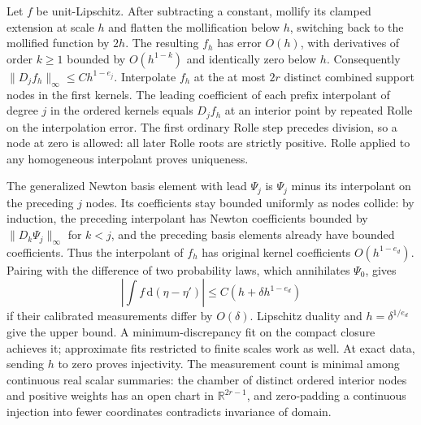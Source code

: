 \documentclass[11pt]{article}
\begin{document}
Let \(f\) be unit-Lipschitz. After subtracting a constant, mollify its clamped extension at scale \(h\) and flatten the mollification below \(h\), switching back to the mollified function by \(2h\). The resulting \(f_h\) has error \(O(h)\), with derivatives of order \(k\ge1\) bounded by \(O(h^{1-k})\) and identically zero below \(h\). Consequently \(\|D_jf_h\|_\infty\le C h^{1-e_j}\). Interpolate \(f_h\) at the at most \(2r\) distinct combined support nodes in the first kernels. The leading coefficient of each prefix interpolant of degree \(j\) in the ordered kernels equals \(D_j f_h\) at an interior point by repeated Rolle on the interpolation error. The first ordinary Rolle step precedes division, so a node at zero is allowed: all later Rolle roots are strictly positive. Rolle applied to any homogeneous interpolant proves uniqueness.

The generalized Newton basis element with lead \(\Psi_j\) is \(\Psi_j\) minus its interpolant on the preceding \(j\) nodes. Its coefficients stay bounded uniformly as nodes collide: by induction, the preceding interpolant has Newton coefficients bounded by \(\|D_k\Psi_j\|_\infty\) for \(k<j\), and the preceding basis elements already have bounded coefficients. Thus the interpolant of \(f_h\) has original kernel coefficients \(O(h^{1-e_d})\). Pairing with the difference of two probability laws, which annihilates \(\Psi_0\), gives
\[
 \left|\int f\,\mathrm{d}(\eta-\eta')\right|
 \le C(h+\delta h^{1-e_d})
\]
if their calibrated measurements differ by \(O(\delta)\). Lipschitz duality and \(h=\delta^{1/e_d}\) give the upper bound. A minimum-discrepancy fit on the compact closure achieves it; approximate fits restricted to finite scales work as well. At exact data, sending \(h\) to zero proves injectivity. The measurement count is minimal among continuous real scalar summaries: the chamber of distinct ordered interior nodes and positive weights has an open chart in \(\mathbb R^{2r-1}\), and zero-padding a continuous injection into fewer coordinates contradicts invariance of domain.
\end{document}
